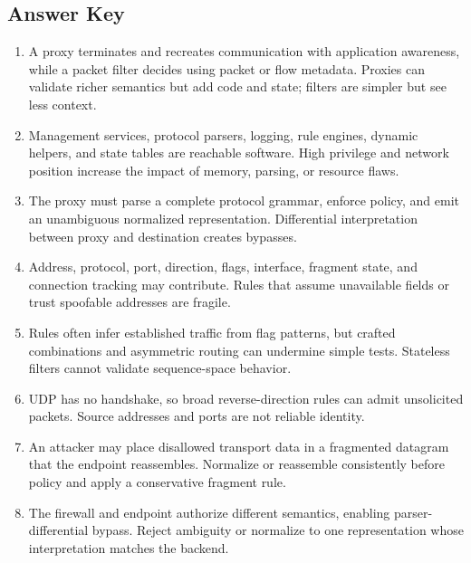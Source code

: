 \documentclass[11pt,letterpaper]{article}
\begin{document}
\subsection*{Answer Key}
\begin{enumerate}
\item A proxy terminates and recreates communication with application awareness, while a packet filter decides using packet or flow metadata. Proxies can validate richer semantics but add code and state; filters are simpler but see less context.
\item Management services, protocol parsers, logging, rule engines, dynamic helpers, and state tables are reachable software. High privilege and network position increase the impact of memory, parsing, or resource flaws.
\item The proxy must parse a complete protocol grammar, enforce policy, and emit an unambiguous normalized representation. Differential interpretation between proxy and destination creates bypasses.
\item Address, protocol, port, direction, flags, interface, fragment state, and connection tracking may contribute. Rules that assume unavailable fields or trust spoofable addresses are fragile.
\item Rules often infer established traffic from flag patterns, but crafted combinations and asymmetric routing can undermine simple tests. Stateless filters cannot validate sequence-space behavior.
\item UDP has no handshake, so broad reverse-direction rules can admit unsolicited packets. Source addresses and ports are not reliable identity.
\item An attacker may place disallowed transport data in a fragmented datagram that the endpoint reassembles. Normalize or reassemble consistently before policy and apply a conservative fragment rule.
\item The firewall and endpoint authorize different semantics, enabling parser-differential bypass. Reject ambiguity or normalize to one representation whose interpretation matches the backend.
\end{enumerate}
\end{document}
